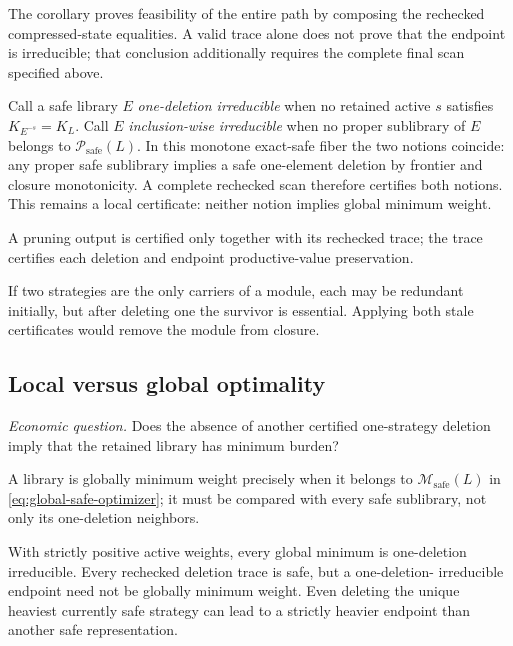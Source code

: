 The corollary proves feasibility of the entire path by composing the
rechecked compressed-state equalities.  A valid trace alone does not prove
that the endpoint is irreducible; that conclusion additionally requires the
complete final scan specified above.

Call a safe library \(E\) \emph{one-deletion irreducible} when no retained
active \(s\) satisfies \(K_{E^{-s}}=K_L\).  Call \(E\)
\emph{inclusion-wise irreducible} when no proper sublibrary of \(E\) belongs
to \(\mathcal P_{\mathrm{safe}}(L)\).  In this monotone exact-safe fiber the
two notions coincide: any proper safe sublibrary implies a safe one-element
deletion by frontier and closure monotonicity.  A complete rechecked scan
therefore certifies both notions.  This remains a local certificate: neither
notion implies global minimum weight.

\begin{proposition}
\label{prop:certified-pruning}
A pruning output is certified only together with its rechecked trace; the
trace certifies each deletion and endpoint productive-value preservation.
\end{proposition}

\begin{example}
\label{ex:t3-deletion-classes}
If two strategies are the only carriers of a module, each may be redundant
initially, but after deleting one the survivor is essential.  Applying both
stale certificates would remove the module from closure.
\end{example}

\subsection{Local versus global optimality}

\emph{Economic question.}  Does the absence of another certified
one-strategy deletion imply that the retained library has minimum burden?

A library is globally minimum weight precisely when it belongs to
\(\mathcal M_{\mathrm{safe}}(L)\) in
\eqref{eq:global-safe-optimizer}; it must be compared with every safe
sublibrary, not only its one-deletion neighbors.

\begin{theorem}
\label{thm:local-global-safe-compression}
With strictly positive active weights, every global minimum is one-deletion
irreducible.  Every rechecked deletion trace is safe, but a one-deletion-
irreducible endpoint need not be globally minimum weight.  Even deleting the
unique heaviest currently safe strategy can lead to a strictly heavier
endpoint than another safe representation.
\end{theorem}

